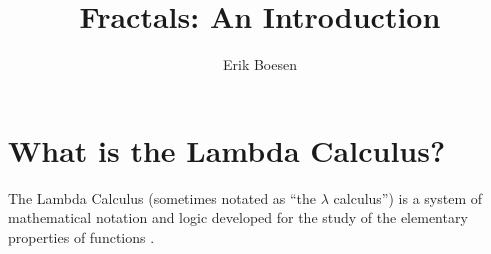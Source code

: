 \documentclass{article}
\begin{document}
\title{Fractals: An Introduction}
\author{Erik Boesen}
\maketitle

\begin{abstract}
\end{abstract}

\section{What is the Lambda Calculus?}
The Lambda Calculus (sometimes notated as ``the $\lambda$ calculus'') is a system of mathematical notation and logic developed for the study of the elementary properties of functions \cite{rojastutorial}.


\end{document}
